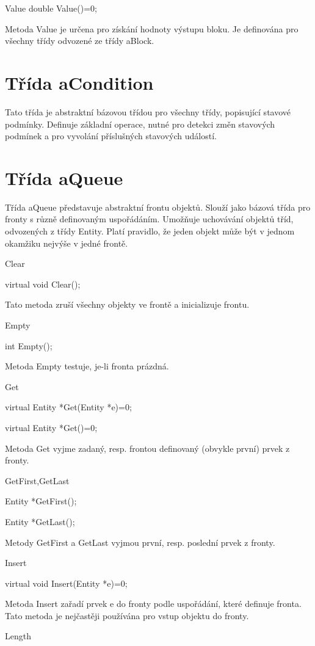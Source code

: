 \documentclass[a4paper]{article}
\begin{document}
Value
  double Value()=0;

Metoda Value je určena pro získání hodnoty výstupu bloku.
Je definována pro všechny třídy odvozené ze třídy aBlock.


\section{Třída aCondition}

Tato třída je abstraktní bázovou třídou pro všechny třídy, popisující
stavové podmínky. Definuje základní operace, nutné pro detekci změn
stavových podmínek a pro vyvolání příslušných stavových událostí.

\section{Třída aQueue}

Třída aQueue představuje abstraktní frontu objektů. Slouží
jako bázová třída pro fronty s různě definovaným uspořádáním. Umožňuje
uchovávání objektů tříd, odvozených z třídy Entity. Platí
pravidlo, že jeden objekt může být v jednom okamžiku nejvýše v jedné
frontě.

Clear

  virtual void Clear();

Tato metoda zruší všechny objekty ve frontě a inicializuje frontu.

Empty

  int Empty();

Metoda Empty testuje, je-li fronta prázdná.

Get

  virtual Entity *Get(Entity *e)=0;

  virtual Entity *Get()=0;

Metoda Get vyjme zadaný, resp. frontou definovaný (obvykle
první) prvek z fronty.

GetFirst,GetLast

  Entity *GetFirst();

  Entity *GetLast();

Metody GetFirst a GetLast vyjmou první, resp. poslední
prvek z fronty.

Insert

  virtual void Insert(Entity *e)=0;

Metoda Insert zařadí prvek e do fronty podle uspořádání,
které definuje fronta. Tato metoda je nejčastěji používána pro vstup
objektu do fronty.

Length
\end{document}
